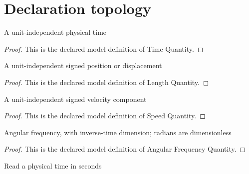 \section{Declaration topology}
\begin{definition}
  \label{def:physics:phyx-mini-0254:phyxminiproblems-problemphyxmini0254-timequantity}
  A unit-independent physical time
\end{definition}
\begin{proof}
  This is the declared model definition of Time Quantity.
\end{proof}
\begin{definition}
  \label{def:physics:phyx-mini-0254:phyxminiproblems-problemphyxmini0254-lengthquantity}
  A unit-independent signed position or displacement
\end{definition}
\begin{proof}
  This is the declared model definition of Length Quantity.
\end{proof}
\begin{definition}
  \label{def:physics:phyx-mini-0254:phyxminiproblems-problemphyxmini0254-speedquantity}
  A unit-independent signed velocity component
\end{definition}
\begin{proof}
  This is the declared model definition of Speed Quantity.
\end{proof}
\begin{definition}
  \label{def:physics:phyx-mini-0254:phyxminiproblems-problemphyxmini0254-angularfrequencyquantity}
  Angular frequency, with inverse-time dimension; radians are dimensionless
\end{definition}
\begin{proof}
  This is the declared model definition of Angular Frequency Quantity.
\end{proof}
\begin{definition}
  \label{def:physics:phyx-mini-0254:phyxminiproblems-problemphyxmini0254-timeinseconds}
  Read a physical time in seconds
\end{definition}
